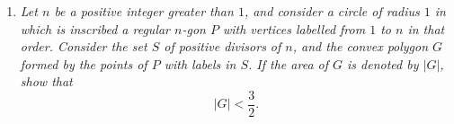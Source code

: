 \documentclass{article}
\begin{document}
\begin{enumerate}
\medskip
\item %
{\itshape Let $n$ be a positive integer greater than $1$, and consider a circle of radius $1$ in which is inscribed a regular $n$-gon $P$ with vertices labelled from $1$ to $n$ in that order.
Consider the set $S$ of positive divisors of $n$, and the convex polygon $G$ formed by the points of $P$ with labels in $S$.
If the area of $G$ is denoted by $|G|$, show that
\[ 
	|G| < \frac{3}{2}.
\]}


\end{enumerate}
\end{document}
